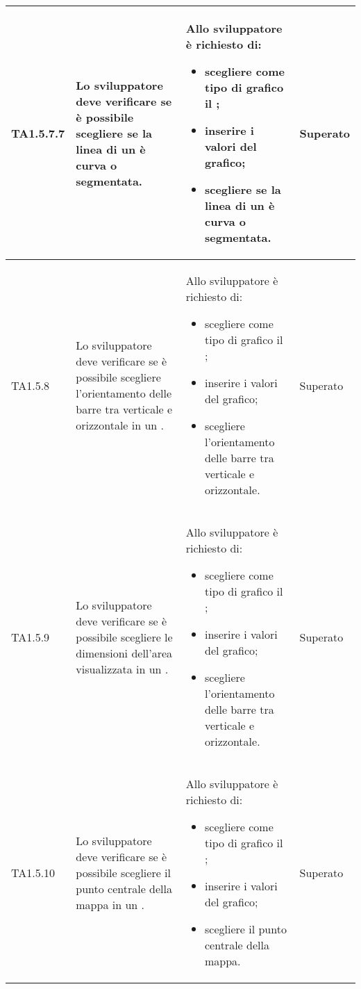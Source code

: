 \begin{longtabu}{| X[0.5] | X | X | X[0.5] |}
	TA1.5.7.7 & Lo sviluppatore deve verificare se è possibile scegliere se la linea di un  è curva o segmentata.

		& Allo sviluppatore è richiesto di:
		\begin{itemize}
			\item scegliere come tipo di grafico il ;
			\item inserire i valori del grafico;
			\item scegliere se la linea di un  è curva o segmentata.
		\end{itemize}
& Superato \\ \hline

	TA1.5.8 & Lo sviluppatore deve verificare se è possibile scegliere l'orientamento delle barre tra verticale e orizzontale in un .

		& Allo sviluppatore è richiesto di:
		\begin{itemize}
			\item scegliere come tipo di grafico il ;
			\item inserire i valori del grafico;
			\item scegliere l'orientamento delle barre tra verticale e orizzontale.
		\end{itemize}
& Superato \\ \hline

	TA1.5.9 & Lo sviluppatore deve verificare se è possibile scegliere le dimensioni dell'area visualizzata in un .

		& Allo sviluppatore è richiesto di:
		\begin{itemize}
			\item scegliere come tipo di grafico il ;
			\item inserire i valori del grafico;
			\item scegliere l'orientamento delle barre tra verticale e orizzontale.
		\end{itemize}
& Superato \\ \hline

	TA1.5.10 & Lo sviluppatore deve verificare se è possibile scegliere il punto centrale della mappa in un .

		& Allo sviluppatore è richiesto di:
		\begin{itemize}
			\item scegliere come tipo di grafico il ;
			\item inserire i valori del grafico;
			\item scegliere il punto centrale della mappa.
		\end{itemize}
& Superato \\ \hline


\end{longtabu}
